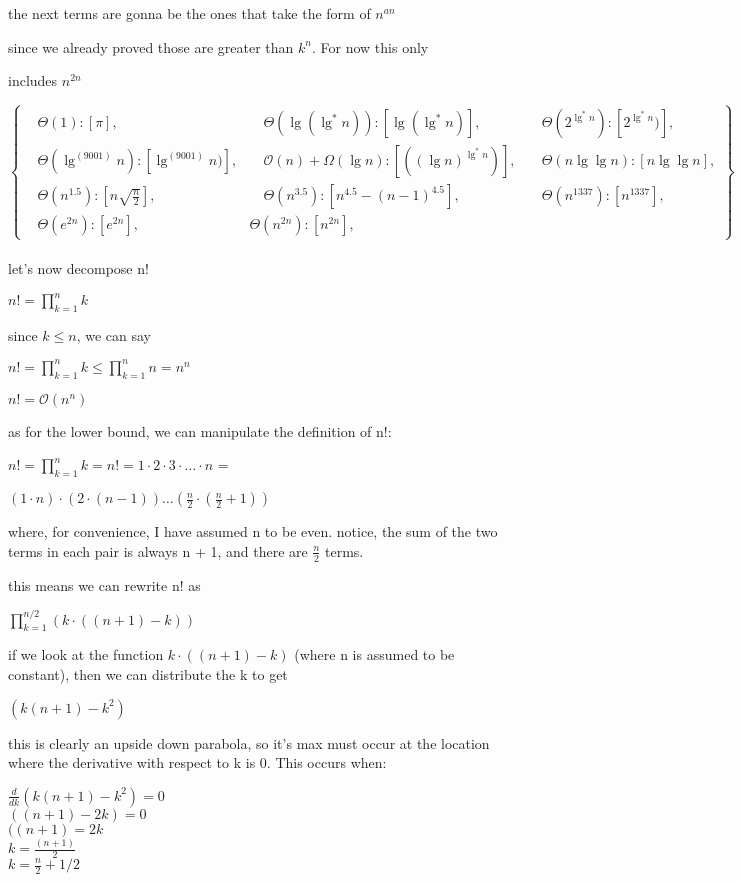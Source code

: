 \documentclass[11pt,fleqn]{article}
\theoremstyle{definition}
\theoremstyle{remark}
\begin{document}
the next terms are gonna be the ones that take the form of $n^{an}$

since we already proved those are greater than $k^n$. For now this only 

includes $n^{2n}$

\[
\left\{
\begin{aligned}
& \Theta(1): [\pi],
& \quad \Theta(\lg(\lg^*n)): [\lg(\lg^*n)],
& \quad \Theta(2^{\lg^*n}): [2^{\lg^*n})],\\
& \Theta(\lg^{(9001)} n): [\lg^{(9001)} n)],
& \quad \mathcal{O}(n)+\Omega(\lg n): [({(\lg n)}^{\lg^*{n}})],
& \quad \Theta(n\lg \lg n): [n\lg \lg n],\\
& \Theta(n^{1.5}): [n\sqrt{\frac{n}{2}}],
& \quad \Theta(n^{3.5}): [n^{4.5} - (n - 1)^{4.5}], 
& \quad \Theta(n^{1337}): [n^{1337}],\\
& \Theta(e^{2n}): [e^{2n}],
& \Theta(n^{2n}): [n^{2n}],
\end{aligned}
\right\}
\]\\

let's now decompose n!

$n! = \prod_{k=1}^{n} k$

since $k\leq n$, we can say

$n! = \prod_{k=1}^{n} k \leq  \prod_{k=1}^{n} n = n^n$

$n! = \mathcal{O}(n^n)$

as for the lower bound, we can manipulate the definition of n!:

$n! = \prod_{k=1}^{n} k = n! = 1 \cdot 2 \cdot 3 \cdot \dots \cdot n$ = 

$(1 \cdot n) \cdot (2 \cdot (n-1))  \dots (\frac{n}{2} \cdot (\frac{n}{2} + 1))$

where, for convenience, I have assumed n to be even.
notice, the sum of the two terms in each pair is always n + 1,
and there are $\frac{n}{2}$ terms.

this means we can rewrite n! as 

$\prod_{k=1}^{n/2} (k \cdot ((n + 1) - k))$

if we look at the function $k \cdot ((n + 1) - k)$ (where n is assumed to be 
constant), then we can distribute the k to get 

$(k(n + 1) - k^2)$

this is clearly an upside down parabola, so it's max must occur
at the location where the derivative with respect to k is 0.
This occurs when:

$\frac{d}{dk}(k(n + 1) - k^2) = 0$\\
$((n + 1) - 2k) = 0$\\
$((n + 1) = 2k$\\
$k = \frac{(n + 1)}{2}$\\
$k = \frac{n}{2} + 1/2$
\end{document}
